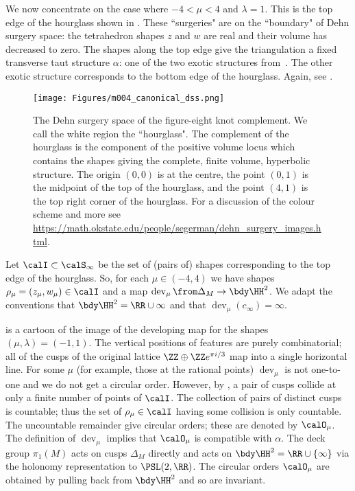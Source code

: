 \documentclass[12pt]{amsart}
\newcommand{\dev}{\operatorname{dev}}
\begin{document}
\begin{example}
We now concentrate on the case where $-4 < \mu < 4$ and $\lambda = 1$.  This is the top edge of the hourglass shown in .  These ``surgeries" are on the ``boundary" of Dehn surgery space: the tetrahedron shapes $z$ and $w$ are real and their volume has decreased to zero.
The shapes along the top edge give the triangulation a fixed transverse taut structure $\alpha$: one of the two exotic structures from~\cite[Proposition 6.8]{FuterGueritaud13}.  The other exotic structure corresponds to the bottom edge of the hourglass. Again, see .

\begin{figure}[htbp]
\texttt{[image: Figures/m004\_canonical\_dss.png]}
\caption{The Dehn surgery space of the figure-eight knot complement.  We call the white region the ``hourglass".  The complement of the hourglass is the component of the positive volume locus which contains the shapes giving the complete, finite volume, hyperbolic structure.  The origin $(0, 0)$ is at the centre, the point $(0, 1)$  is the midpoint of the top of the hourglass, and the point $(4,1)$ is the top right corner of the hourglass.  For a discussion of the colour scheme and more see \url{https://math.okstate.edu/people/segerman/dehn_surgery_images.html}.}
\label{Fig:m004_canonical_dss}
\end{figure}

Let $\calI \subset \calS_\infty$ be the set of (pairs of) shapes corresponding to the top edge of the hourglass.  So, for each $\mu \in (-4, 4)$ we have shapes $\rho_\mu = (z_\mu, w_\mu) \in \calI$ and a map $\dev_\mu \from \Delta_M \to \bdy \HH^2$.  We adapt the conventions that $\bdy \HH^2 = \RR \cup \infty$ and that $\dev_\mu(c_\infty) = \infty$. 

 is a cartoon of the image of the developing map for the shapes $(\mu, \lambda) = (-1,1)$.  The vertical positions of features are purely combinatorial; all of the cusps of the original lattice $\ZZ \oplus \ZZ e^{\pi i/3}$ map into a single horizontal line.  For some $\mu$ (for example, those at the rational points) $\dev_\mu$ is not one-to-one and we do not get a circular order.  However, by , a pair of cusps collide at only a finite number of points of $\calI$.   The collection of pairs of distinct cusps is countable; thus the set of $\rho_\mu \in \calI$ having some collision is only countable.  The uncountable remainder give circular orders; these are denoted by $\calO_\mu$.  The definition of $\dev_\mu$ implies that $\calO_\mu$ is compatible with $\alpha$.  The deck group $\pi_1(M)$ acts on cusps $\Delta_M$ directly and acts on $\bdy \HH^2 = \RR \cup \{\infty\}$ via the holonomy representation to $\PSL(2,\RR)$.  The circular orders $\calO_\mu$ are obtained by pulling back from $\bdy \HH^2$ and so are invariant.


\end{example}
\end{document}
